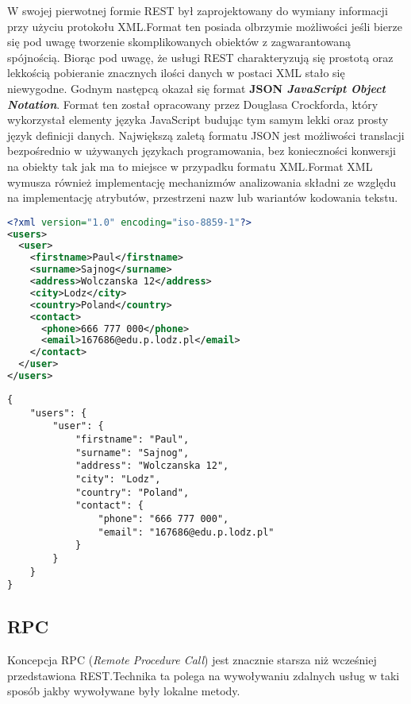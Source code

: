 W swojej pierwotnej formie REST był zaprojektowany do wymiany informacji przy użyciu protokołu XML.\@ Format ten posiada olbrzymie możliwości jeśli bierze się pod uwagę tworzenie skomplikowanych obiektów z zagwarantowaną spójnością. Biorąc pod uwagę, że usługi REST charakteryzują się prostotą oraz lekkością pobieranie znacznych ilości danych w postaci XML stało się niewygodne. Godnym następcą okazał się format \textbf{JSON \textit{JavaScript Object Notation}}. Format ten został opracowany przez Douglasa Crockforda, który wykorzystał elementy języka JavaScript budując tym samym lekki oraz prosty język definicji danych. Największą zaletą formatu JSON jest możliwości translacji bezpośrednio w używanych językach programowania, bez konieczności konwersji na obiekty tak jak ma to miejsce w przypadku formatu XML.\@ Format XML wymusza również implementację mechanizmów analizowania składni ze względu na implementację atrybutów, przestrzeni nazw lub wariantów kodowania tekstu.
\begin{lstlisting}[language=xml, caption=Dane zapisane w formacie XML]
<?xml version="1.0" encoding="iso-8859-1"?>
<users>
  <user>
    <firstname>Paul</firstname>
    <surname>Sajnog</surname>
    <address>Wolczanska 12</address>
    <city>Lodz</city>
    <country>Poland</country>
    <contact>
      <phone>666 777 000</phone>
      <email>167686@edu.p.lodz.pl</email>
    </contact>
  </user>
</users>
\end{lstlisting}
\begin{lstlisting}[caption=Dane zapisane w formacie JSON]
{
    "users": {
        "user": {
            "firstname": "Paul",
            "surname": "Sajnog",
            "address": "Wolczanska 12",
            "city": "Lodz",
            "country": "Poland",
            "contact": {
                "phone": "666 777 000",
                "email": "167686@edu.p.lodz.pl"
            }
        }
    }
}
    \end{lstlisting}
\subsection{RPC}
Koncepcja RPC (\textit{Remote Procedure Call}) jest znacznie starsza niż wcześniej przedstawiona REST.\@ Technika ta polega na wywoływaniu zdalnych usług w taki sposób jakby wywoływane były lokalne metody.  